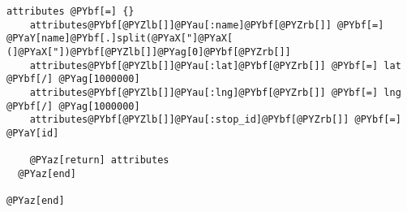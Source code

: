 \begin{Verbatim}[commandchars=@\[\]]
    attributes @PYbf[=] {}
    attributes@PYbf[@PYZlb[]]@PYau[:name]@PYbf[@PYZrb[]] @PYbf[=] @PYaY[name]@PYbf[.]split(@PYaX["]@PYaX[ (]@PYaX["])@PYbf[@PYZlb[]]@PYag[0]@PYbf[@PYZrb[]]
    attributes@PYbf[@PYZlb[]]@PYau[:lat]@PYbf[@PYZrb[]] @PYbf[=] lat @PYbf[/] @PYag[1000000]
    attributes@PYbf[@PYZlb[]]@PYau[:lng]@PYbf[@PYZrb[]] @PYbf[=] lng @PYbf[/] @PYag[1000000]
    attributes@PYbf[@PYZlb[]]@PYau[:stop_id]@PYbf[@PYZrb[]] @PYbf[=] @PYaY[id]

    @PYaz[return] attributes
  @PYaz[end]

@PYaz[end]
\end{Verbatim}
